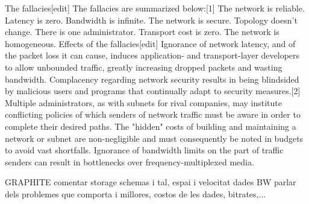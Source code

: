 The fallacies[edit]
The fallacies are summarized below:[1]
The network is reliable.
Latency is zero.
Bandwidth is infinite.
The network is secure.
Topology doesn't change.
There is one administrator.
Transport cost is zero.
The network is homogeneous.
Effects of the fallacies[edit]
Ignorance of network latency, and of the packet loss it can cause, induces application- and transport-layer developers to allow unbounded traffic, greatly increasing dropped packets and wasting bandwidth.
Complacency regarding network security results in being blindsided by malicious users and programs that continually adapt to security measures.[2]
Multiple administrators, as with subnets for rival companies, may institute conflicting policies of which senders of network traffic must be aware in order to complete their desired paths.
The "hidden" costs of building and maintaining a network or subnet are non-negligible and must consequently be noted in budgets to avoid vast shortfalls.
Ignorance of bandwidth limits on the part of traffic senders can result in bottlenecks over frequency-multiplexed media.


GRAPHITE
comentar storage schemas i tal, espai i velocitat dades BW
parlar dels problemes que comporta i millores, costos de les dades, bitrates,...